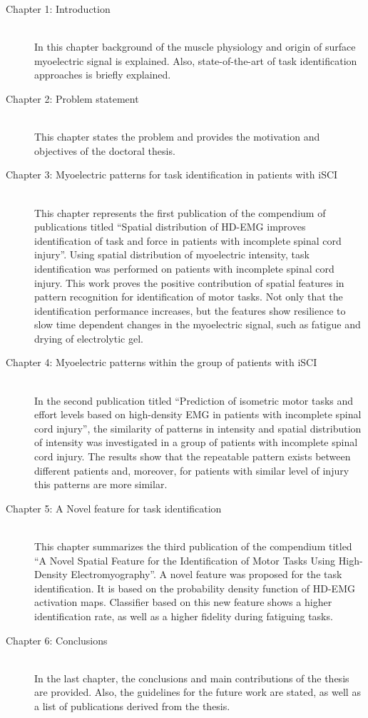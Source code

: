 \begin{description}
\item[Chapter 1: Introduction] \hfill \\
	In this chapter background of the muscle physiology and origin of surface myoelectric signal is explained. Also, state-of-the-art of task identification approaches is briefly explained.  

\item[Chapter 2: Problem statement] \hfill \\
	This chapter states the problem and provides the motivation and objectives of the doctoral thesis.
	
\item[Chapter 3: Myoelectric patterns for task identification in patients with iSCI] \hfill \\
	This chapter represents the first publication of the compendium of publications titled “Spatial distribution of HD-EMG improves identification of task and force in patients with incomplete spinal cord injury”. Using spatial distribution of myoelectric intensity, task identification was performed on patients with incomplete spinal cord injury. This work proves the positive contribution of spatial features in pattern recognition for identification of motor tasks. Not only that the identification performance increases, but the features show resilience to slow time dependent changes in the myoelectric signal, such as fatigue and drying of electrolytic gel.
	
\item[Chapter 4: Myoelectric patterns within the group of patients with iSCI] \hfill \\
	In the second publication titled “Prediction of isometric motor tasks and effort levels based on high-density EMG in patients with incomplete spinal cord injury”, the similarity of patterns in intensity and spatial distribution of intensity was investigated in a group of  patients with incomplete spinal cord injury. The results show that the repeatable pattern exists between different patients and, moreover, for patients with similar level of injury this patterns are more similar.

\item[Chapter 5: A Novel feature for task identification] \hfill \\
	This chapter summarizes the  third publication of the compendium titled “A Novel Spatial Feature for the Identification of Motor Tasks Using High-Density Electromyography”. A novel feature was proposed for the task identification. It is based on the probability density function of HD-EMG activation maps. Classifier based on this new feature shows a higher identification rate, as well as a higher fidelity during fatiguing tasks.

\item[Chapter 6: Conclusions] \hfill \\
	In the last chapter, the conclusions and main contributions of the thesis are provided. Also, the guidelines for the future work are stated, as well as a list of publications derived from the thesis.

\end{description}





\

